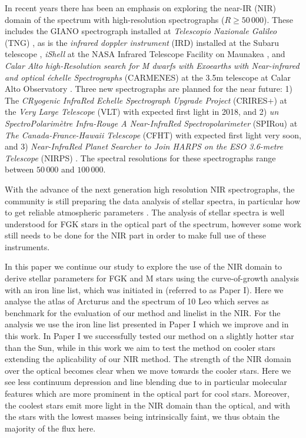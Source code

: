 \documentclass[a4paper,fleqn,usenatbib]{mnras}
\begin{document}
In recent years there has been an emphasis on exploring the near-IR (NIR) domain of the spectrum
with high-resolution spectrographs ($R\ge50\,000$). These includes the GIANO spectrograph installed
at \emph{Telescopio Nazionale Galileo} (TNG) \citep{GIANO}, as is the \emph{infrared doppler
instrument} (IRD) installed at the Subaru telescope \citep{IRD}, \emph{iShell} at the NASA Infrared
Telescope Facility on Maunakea \citep{Rayner2016}, and \emph{Calar Alto high-Resolution search for M
dwarfs with Exoearths with Near-infrared and optical \'echelle Spectrographs} (CARMENES) at the
3.5m telescope at Calar Alto Observatory \citep{CARMENES}. Three new spectrographs are
planned for the near future: 1) The \emph{CRyogenic InfraRed Echelle Spectrograph Upgrade Project}
(CRIRES+) at the \emph{Very Large Telescope} (VLT) \citep{CRIRESp} with expected first light in
2018, and 2) \emph{un SpectroPolarim\`etre Infra-Rouge A Near-InfraRed Spectropolarimeter} (SPIRou) at
\emph{The Canada-France-Hawaii Telescope} (CFHT) \citep{SPIROU1,SPIROU2} with expected first light
very soon, and 3) \emph{Near-InfraRed Planet Searcher to Join HARPS on the ESO 3.6-metre Telescope}
(NIRPS) \citep{Bouchy2017}. The spectral resolutions for these spectrographs range between $50\,000$
and $100\,000$.

With the advance of the next generation high resolution NIR spectrographs, the community is still
preparing the data analysis of stellar spectra, in particular how to get reliable atmospheric
parameters \citep[see e.g.][]{Onehag2012,Lindgren2016,Andreasen2016,Passegger2016}. The analysis of
stellar spectra is well understood for FGK stars in the optical part of the spectrum, however some
work still needs to be done for the NIR part in order to make full use of these instruments.

In this paper we continue our study to explore the use of the NIR domain to derive stellar
parameters for FGK and M stars using the curve-of-growth analysis with an iron line list, which was
initiated in \citet{Andreasen2016} (referred to as Paper I). Here we analyse the atlas of Arcturus
and the spectrum of 10 Leo which serves as benchmark for the evaluation of our method and linelist
in the NIR. For the analysis we use the iron line list presented in Paper I which we improve and 
in this work. In Paper I we successfully tested our method on a slightly hotter star than
the Sun, while in this work we aim to test the method on cooler stars extending the aplicability of
our NIR method. The strength of the NIR domain over the optical becomes clear when we move towards
the cooler stars. Here we see less continuum depression and line blending due to in particular
molecular features which are more prominent in the optical part for cool stars. Moreover, the
coolest stars emit more light in the NIR domain than the optical, and with the stars with the lowest
masses being intrinsically faint, we thus obtain the majority of the flux here.
\end{document}
